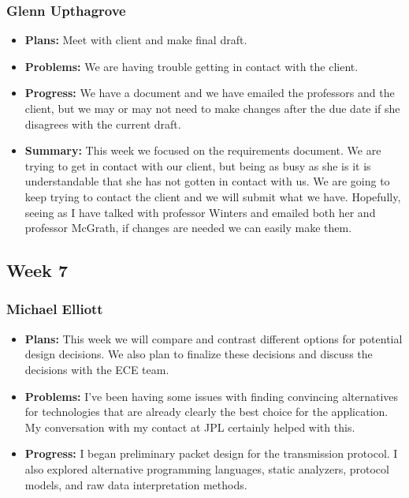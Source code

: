 \documentclass[onecolumn, draftclsnofoot,10pt, compsoc]{IEEEtran}
\begin{document}
\subsubsection{Glenn Upthagrove}
\begin {itemize}
 \item \textbf{Plans: }Meet with client and make final draft. 
 \item \textbf{Problems: }We are having trouble getting in contact with the client.
 \item \textbf{Progress: }We have a document and we have emailed the professors and the client, but we may or may not need to make changes after the due date if she disagrees with the current draft.
 \item \textbf{Summary: }This week we focused on the requirements document. We are trying to get in contact with our client, but being as busy as she is it is understandable that she has not gotten in contact with us. We are going to keep trying to contact the client and we will submit what we have. Hopefully, seeing as I have talked with professor Winters and emailed both her and professor McGrath, if changes are needed we can easily make them.  
\end {itemize}
\subsection {Week 7}
\subsubsection{Michael Elliott}
\begin {itemize}
\item \textbf{Plans: }
  This week we will compare and contrast different options for potential design decisions. We also plan to finalize these decisions and discuss the decisions with the ECE team.
\item \textbf{Problems: }
  I've been having some issues with finding convincing alternatives for technologies that are already clearly the best choice for the application. My conversation with my contact at JPL certainly helped with this.
\item \textbf{Progress: }
  I began preliminary packet design for the transmission protocol. I also explored alternative programming languages, static analyzers, protocol models, and raw data interpretation methods.
\end {itemize}
\end{document}
